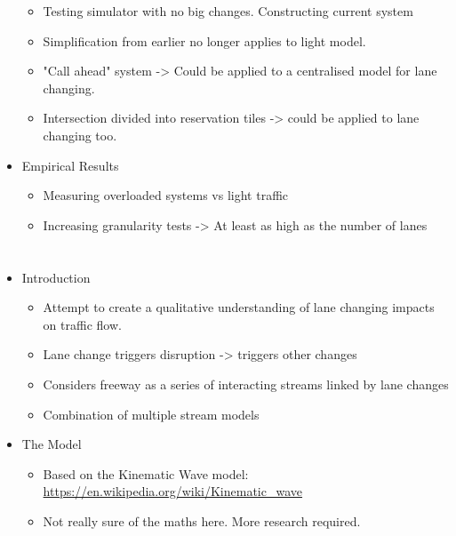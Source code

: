 \begin{itemize}
\begin{itemize}
\item Testing simulator with no big changes. Constructing current system
\end{itemize}
\begin{itemize}
\item Simplification from earlier no longer applies to light model.
\item "Call ahead" system -> Could be applied to a centralised model for lane changing.
\item Intersection divided into reservation tiles -> could be applied to lane changing too.
\end{itemize}
\item Empirical Results
\begin{itemize}
\item Measuring overloaded systems vs light traffic
\item Increasing granularity tests -> At least as high as the number of lanes
\end{itemize}
\end{itemize}

\section{}
\label{sec:Laval2006}

\begin{itemize}
\item Introduction
\begin{itemize}
\item Attempt to create a qualitative understanding of lane changing impacts on traffic flow.
\item Lane change triggers disruption -> triggers other changes
\item Considers freeway as a series of interacting streams linked by lane changes
\item Combination of multiple stream models
\end{itemize}
\item The Model
\begin{itemize}
\item Based on the Kinematic Wave model: \url{https://en.wikipedia.org/wiki/Kinematic_wave}
\item Not really sure of the maths here. More research required.
\end{itemize}
\end{itemize}

\section{}
\label{sec:Kesting2007}

